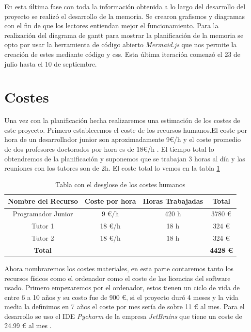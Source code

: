 En esta última fase con toda la información obtenida a lo largo del desarrollo del proyecto se realizó el desarrollo de la memoria. Se crearon grafismos y diagramas con el fin de que los lectores entiendan mejor el funcionamiento. Para la realización del diagrama de gantt para mostrar la planificación de la memoria se opto por usar la herramienta de código abierto \textit{Mermaid.js} que nos permite la creación de estes mediante código y css. Esta última iteración comenzó el 23 de julio hasta el 10 de septiembre.


\section{Costes}
Una vez con la planificación hecha realizaremos una estimación de los costes de este proyecto. Primero establecemos el coste de los recursos humanos.El coste por hora de un desarrollador junior son aproximadamente 9€/h \cite{saljun} y el coste promedio de dos profesores doctorados por hora es de 18€/h \cite{saldoc}. El tiempo total lo obtendremos de la planificación y suponemos que se trabajan 3 horas al día y las reuniones con los tutores son de 2h. El coste total lo vemos en la tabla \ref{tabcospes}

\begin{table}[hp!]
   \centering
  \begin{tabular}{c|c|c|c}
  \rowcolor{udcpink!25}
  \textbf{Nombre del Recurso} & \textbf{Coste por hora} & \textbf{Horas Trabajadas} & \textbf{Total}\\\hline
  
  Programador Junior & 9 €/h & 420 h & 3780 € \\
  Tutor 1 & 18 €/h & 18 h & 324 € \\
  Tutor 2 & 18 €/h & 18 h & 324 €  \\
  \textbf{Total}  & & & \textbf{4428 €}\\

  \end{tabular}

  \caption{Tabla con el desglose de los costes humanos}
  \label{tabcospes}


\end{table}

  Ahora nombraremos los costes materiales, en esta parte contaremos tanto los recursos físicos como el ordenador como el coste de las licencias del software usado. Primero empezaremos por el ordenador, estos tienen un ciclo de vida de entre 6 a 10 años y su costo fue de 900 €, si el proyecto duró 4 meses y la vida media la definimos en 7 años el coste por mes sería de sobre 11 € al mes. Para el desarrollo se uso el IDE \textit{Pycharm} de la empresa \textit{JetBrains}  que tiene un coste de 24.99 € al mes \cite{costjet}.

